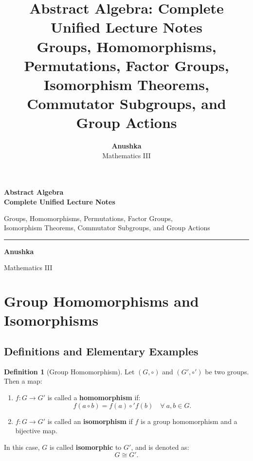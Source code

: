 \documentclass[12pt]{article}
\title{\textbf{\huge Abstract Algebra: Complete Unified Lecture Notes}\\[0.5em]
\Large Groups, Homomorphisms, Permutations, Factor Groups, Isomorphism Theorems, Commutator Subgroups, and Group Actions}
\author{\textbf{\Huge Anushka}\\[0.4em] \Large Mathematics III}
\date{}
\theoremstyle{definition}
\newtheorem{definition}{Definition}[section]
\theoremstyle{plain}
\begin{document}
\begin{titlepage}
    \centering
    \vspace*{3cm}
    
    {\textbf{\Huge Abstract Algebra}\\[0.4em]
    \textbf{\huge Complete Unified Lecture Notes}\par}
    
    \vspace{1.2cm}
    {\Large Groups, Homomorphisms, Permutations, Factor Groups,\\[0.3em]
    Isomorphism Theorems, Commutator Subgroups, and Group Actions\par}
    
    \vspace{1.5cm}
    \rule{0.5\textwidth}{1pt}
    
    \vspace{1.5cm}
    {\textbf{\Huge Anushka}\par}
    \vspace{0.4cm}
    {\Large Mathematics III\par}
    
    \vfill
    \vspace*{1.5cm}
\end{titlepage}

\tableofcontents
\newpage

\section{Group Homomorphisms and Isomorphisms}

\subsection{Definitions and Elementary Examples}

\begin{definition}[Group Homomorphism]
Let $(G, \circ)$ and $(G', \circ')$ be two groups. Then a map:
\begin{enumerate}
    \item $f: G \longrightarrow G'$ is called a \textbf{homomorphism} if:
    \[
    f(a \circ b) = f(a) \circ' f(b) \quad \forall\ a, b \in G.
    \]
    \item $f: G \longrightarrow G'$ is called an \textbf{isomorphism} if $f$ is a group homomorphism and a bijective map.
\end{enumerate}
In this case, $G$ is called \textbf{isomorphic} to $G'$, and is denoted as:
\[
G \cong G'.
\]
\end{definition}
\end{document}
